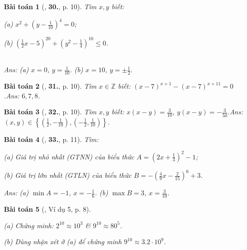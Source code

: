 \documentclass{article}
\numberwithin{equation}{section}
\newtheorem{baitoan}{Bài toán}
\begin{document}
\begin{baitoan}[\cite{Tuyen_Toan_7}, \textbf{30.}, p. 10]
	 Tìm $x,y$ biết:
	 \begin{enumerate*}
	 	\item[(a)] $x^2 + \left(y - \frac{1}{10}\right)^4 = 0$;
	 	\item[(b)] $\left(\frac{1}{2}x - 5\right)^{20} + \left(y^2 - \frac{1}{4}\right)^{10}\le 0$.
	\end{enumerate*}\\\mbox{}\hfill\textsf{Ans:} (a) $x = 0$, $y = \frac{1}{10}$. (b) $x = 10$, $y = \pm\frac{1}{2}$.
\end{baitoan}

\begin{baitoan}[\cite{Tuyen_Toan_7}, \textbf{31.}, p. 10]
	Tìm $x\in\mathbb{Z}$ biết: $(x - 7)^{x + 1} - (x - 7)^{x + 11} = 0$.\hfill\textsf{Ans:} $6,7,8$.
\end{baitoan}

\begin{baitoan}[\cite{Tuyen_Toan_7}, \textbf{32.}, p. 10]
	Tìm $x,y$ biết: $x(x - y) = \frac{3}{10}$, $y(x - y) = -\frac{3}{50}$.\hfill\textsf{Ans:} $(x,y)\in\left\{\left(\frac{1}{2},-\frac{1}{10}\right),\left(-\frac{1}{2},\frac{1}{10}\right)\right\}$.
\end{baitoan}

\begin{baitoan}[\cite{Tuyen_Toan_7}, \textbf{33.}, p. 11]
	Tìm:
	\begin{enumerate*}
		\item[(a)] Giá trị nhỏ nhất (GTNN) của biểu thức $A = \left(2x + \frac{1}{3}\right)^2 - 1$;
		\item[(b)] Giá trị lớn nhất (GTLN) của biểu thức $B = -\left(\frac{4}{9}x - \frac{2}{15}\right)^6 + 3$.
	\end{enumerate*}\hfill\textsf{Ans:} (a) $\min A = -1$, $x = -\frac{1}{6}$. (b) $\max B = 3$, $x = \frac{3}{10}$.
\end{baitoan}

\begin{baitoan}[\cite{Binh_Toan_7_tap_1}, Ví dụ 5, p. 8]
	\begin{enumerate*}
		\item[(a)] Chứng minh: $2^{10}\approx 10^3$ \& $9^{10}\approx 80^5$.
		\item[(b)] Dùng nhận xét ở (a) để chứng minh $9^{10}\approx 3.2\cdot 10^9$.
	\end{enumerate*}
\end{baitoan}
\end{document}

